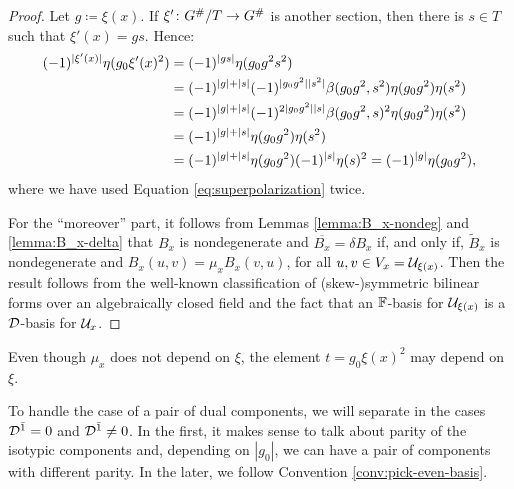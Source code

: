 \begin{proof}
    Let $g \coloneqq \xi(x)$. If $\xi' \colon G^\#/T \to G^\#$ is another section, then there is $s \in T$ such that $\xi' (x) = g s$. 
    Hence:
    \begin{align*}
        (-1)^{|\xi' (x)|} \eta(g_0 \xi' (x)^2) &= (-1)^{|gs|} \eta(g_0 g^2 s^2)\\
        &= (-1)^{|g| + |s|} (-1)^{|g_0 g^2||s^2|} \beta(g_0 g^2, s^2)\eta(g_0 g^2) \eta(s^2)\\
        &= (-1)^{|g| + |s|} (-1)^{2 |g_0 g^2| |s|} \beta(g_0 g^2, s)^2 \eta(g_0 g^2) \eta(s^2) \\
        &= (-1)^{|g| + |s|} \eta(g_0 g^2) \eta(s^2) \\ 
        &= (-1)^{|g| + |s|} \eta(g_0 g^2) (-1)^{|s|} \eta (s)^2 = (-1)^{|g|} \eta(g_0 g^2),
    \end{align*}
    where we have used Equation \eqref{eq:superpolarization} twice. 
    
    For the ``moreover'' part, it follows from Lemmas \ref{lemma:B_x-nondeg} and \ref{lemma:B_x-delta} that $B_x$ is nondegenerate and $\overline{B_x} = \delta B_x$ if, and only if, $\tilde B_x$ is nondegenerate and $B_x (u,v) = \mu_x B_x(v, u)$, for all $u,v \in V_x = \mathcal U_{\xi(x)}$. 
    Then the result follows from the well-known classification of (skew-)symmetric bilinear forms over an algebraically closed field and the fact that an $\mathbb{F}$-basis for $\mathcal U_{\xi(x)}$ is a $\mathcal{D}$-basis for $\mathcal U_x$.
\end{proof}

\begin{remark}
    Even though $\mu_{x}$ does not depend on $\xi$, the element $t = g_0\xi(x)^2$ may depend on $\xi$.
\end{remark}

To handle the case of a pair of dual components, we will separate in the cases $\mathcal{D}^{\bar1} = 0$ and $\mathcal{D}^{\bar1} \neq 0$. 
In the first, it makes sense to talk about parity of the isotypic components and, depending on $|g_0|$, we can have a pair of components with different parity. 
In the later, we follow Convention \ref{conv:pick-even-basis}.  


